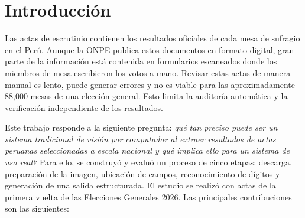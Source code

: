 \documentclass[conference]{IEEEtran}
\begin{document}
\section{Introducci\'on}
Las actas de escrutinio contienen los resultados oficiales de cada mesa de
sufragio en el Per\'u. Aunque la ONPE publica estos documentos en formato
digital, gran parte de la informaci\'on est\'a contenida en formularios
escaneados donde los miembros de mesa escribieron los votos a mano. Revisar
estas actas de manera manual es lento, puede generar errores y no es viable
para las aproximadamente 88,000 mesas de una elecci\'on general. Esto limita
la auditor\'ia autom\'atica y la verificaci\'on independiente de los resultados.

Este trabajo responde a la siguiente pregunta: \emph{\textquestiondown qu\'e
tan preciso puede ser un sistema tradicional de visi\'on por computador al
extraer resultados de actas peruanas seleccionadas a escala nacional y qu\'e
implica ello para un sistema de uso real?} Para ello, se construy\'o y evalu\'o
un proceso de cinco etapas: descarga, preparaci\'on de la imagen, ubicaci\'on de
campos, reconocimiento de d\'igitos y generaci\'on de una salida estructurada.
El estudio se realiz\'o con actas de la primera vuelta de las Elecciones
Generales 2026. Las principales contribuciones son las siguientes:
\end{document}
